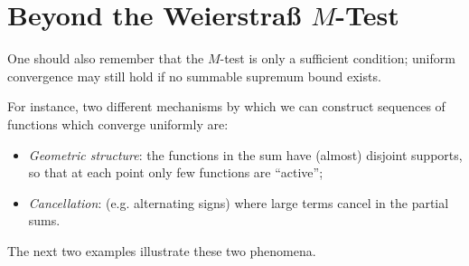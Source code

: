 \documentclass[../analysis1.tex]{subfiles}
\begin{document}
\section{Beyond the Weierstraß \texorpdfstring{$M$}{M}-Test}

One should also remember that the $M$-test is only a sufficient condition; uniform convergence may still hold if no summable supremum bound exists.

For instance, two different mechanisms by which we can construct sequences of functions which converge uniformly are:
\begin{itemize}
    \item \textit{Geometric structure}: the functions in the sum have (almost) disjoint supports, so that at each point only few functions are ``active'';
    \item \textit{Cancellation}: (e.g. alternating signs) where large terms cancel in the partial sums.
\end{itemize}
The next two examples illustrate these two phenomena.
\end{document}
